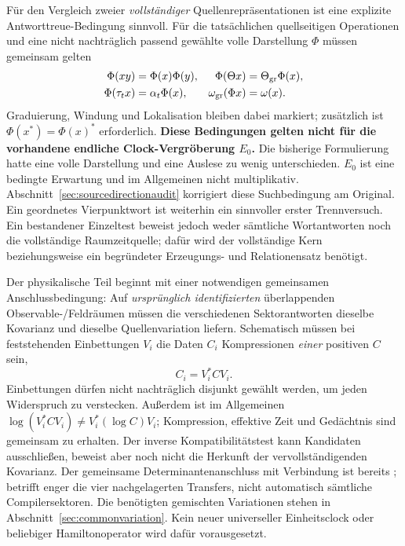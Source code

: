 Für den Vergleich zweier \emph{vollständiger} Quellenrepräsentationen ist eine explizite Antworttreue-Bedingung sinnvoll. Für die tatsächlichen quellseitigen Operationen und eine nicht nachträglich passend gewählte volle Darstellung $\Phi$ müssen gemeinsam gelten
\[
\begin{aligned}
\Phi(xy)&=\Phi(x)\Phi(y),&
\Phi(\Theta x)&=\Theta_{\rm gr}\Phi(x),\\
\Phi(\tau_t x)&=\alpha_t\Phi(x),&
\omega_{\rm gr}(\Phi x)&=\omega(x).
\end{aligned}
\]
Graduierung, Windung und Lokalisation bleiben dabei markiert; zusätzlich ist $\Phi(x^*)=\Phi(x)^*$ erforderlich. \textbf{Diese Bedingungen gelten nicht für die vorhandene endliche Clock-Vergröberung $E_0$.} Die bisherige Formulierung hatte eine volle Darstellung und eine Auslese zu wenig unterschieden. $E_0$ ist eine bedingte Erwartung und im Allgemeinen nicht multiplikativ. Abschnitt~\ref{sec:sourcedirectionaudit} korrigiert diese Suchbedingung am Original. Ein geordnetes Vierpunktwort ist weiterhin ein sinnvoller erster Trennversuch. Ein bestandener Einzeltest beweist jedoch weder sämtliche Wortantworten noch die vollständige Raumzeitquelle; dafür wird der vollständige Kern beziehungsweise ein begründeter Erzeugungs- und Relationensatz benötigt.

Der physikalische Teil beginnt mit einer notwendigen gemeinsamen Anschlussbedingung: Auf \emph{ursprünglich identifizierten} überlappenden Observable-/Feldräumen müssen die verschiedenen Sektorantworten dieselbe Kovarianz und dieselbe Quellenvariation liefern. Schematisch müssen bei feststehenden Einbettungen $V_i$ die Daten $C_i$ Kompressionen \emph{einer} positiven $C$ sein,
\[
 C_i=V_i^*CV_i.
\]
Einbettungen dürfen nicht nachträglich disjunkt gewählt werden, um jeden Widerspruch zu verstecken. Außerdem ist im Allgemeinen $\log(V_i^*CV_i)\ne V_i^*(\log C)V_i$; Kompression, effektive Zeit und Gedächtnis sind gemeinsam zu erhalten. Der inverse Kompatibilitätstest kann Kandidaten ausschließen, beweist aber noch nicht die Herkunft der vervollständigenden Kovarianz. Der gemeinsame Determinantenanschluss mit Verbindung ist bereits ;  betrifft enger die vier nachgelagerten Transfers, nicht automatisch sämtliche Compilersektoren. Die benötigten gemischten Variationen stehen in Abschnitt~\ref{sec:commonvariation}. Kein neuer universeller Einheitsclock oder beliebiger Hamiltonoperator wird dafür vorausgesetzt.


